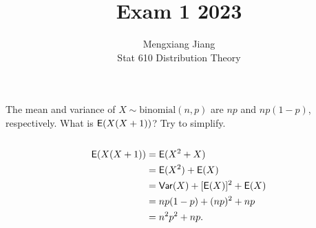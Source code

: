 \documentclass[12pt]{article}
\newcommand{\E}{{\sf E}}
\newcommand{\Var}{{\sf Var}}
\newenvironment{problem}[2][Problem]{\begin{trivlist}
\item[\hskip \labelsep {\bfseries #1}\hskip \labelsep {\bfseries #2.}]}
{\end{trivlist}}
\begin{document}
 
 
\title{Exam 1 2023}%
\author{Mengxiang Jiang\\ %
Stat 610 Distribution Theory} %
 
\maketitle
 
\begin{problem}{1} %
  The mean and variance of $X \sim \text{binomial}(n, p)$ are $np$ 
  and $np(1 - p)$, respectively. What is $\E(X(X + 1))$? Try to simplify.
  \\\\
  \[
    \begin{aligned}
      \E(X(X + 1)) &= \E(X^2 + X) \\
      &= \E(X^2) + \E(X) \\
      &= \Var(X) + [\E(X)]^2 + \E(X) \\
      &= np(1 - p) + (np)^2 + np \\
      &= n^2p^2 + np.
    \end{aligned}
  \]
\end{problem}
\end{document}
